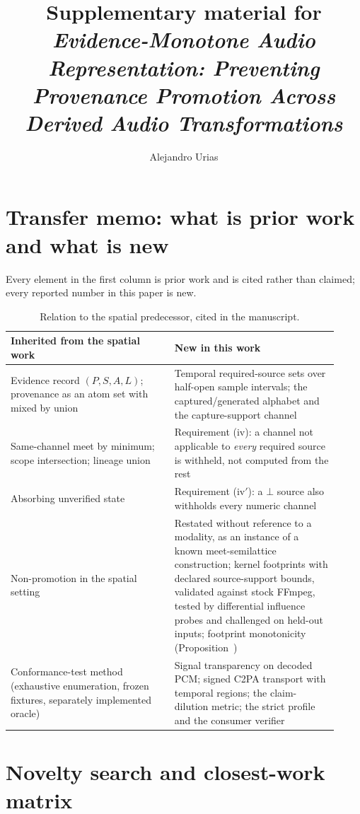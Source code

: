 \documentclass[11pt]{article}
\title{Supplementary material for\\
\emph{Evidence-Monotone Audio Representation: Preventing Provenance Promotion
Across Derived Audio Transformations}}
\author{Alejandro Urias}
\date{}
\begin{document}
\maketitle

\section{Transfer memo: what is prior work and what is new}
\label{s:transfer}

Every element in the first column is prior work and is cited rather than
claimed; every reported number in this paper is new.

\begin{table}[htbp]
\centering
\caption{Relation to the spatial predecessor, cited in the manuscript.}
\label{tab:inherited}
\small
\begin{tabular}{p{0.46\linewidth}p{0.46\linewidth}}
\toprule
Inherited from the spatial work & New in this work \\
\midrule
Evidence record $(P,S,A,L)$; provenance as an atom set with mixed by union &
Temporal required-source sets over half-open sample intervals; the
captured/generated alphabet and the capture-support channel \\
\addlinespace
Same-channel meet by minimum; scope intersection; lineage union &
Requirement (iv): a channel not applicable to \emph{every} required source is
withheld, not computed from the rest \\
\addlinespace
Absorbing unverified state &
Requirement (iv$'$): a $\bot$ source also withholds every numeric channel \\
\addlinespace
Non-promotion in the spatial setting &
Restated without reference to a modality, as an instance of a known
meet-semilattice construction; kernel footprints with declared source-support
bounds, validated against stock FFmpeg, tested by differential influence probes
and challenged on held-out inputs; footprint monotonicity
(Proposition~\PropFootprint{}) \\
\addlinespace
Conformance-test method (exhaustive enumeration, frozen fixtures, separately
implemented oracle) &
Signal transparency on decoded PCM; signed C2PA transport with temporal
regions; the claim-dilution metric; the strict profile and the consumer
verifier \\
\bottomrule
\end{tabular}
\end{table}

\section{Novelty search and closest-work matrix}
\label{s:novelty}
\end{document}
